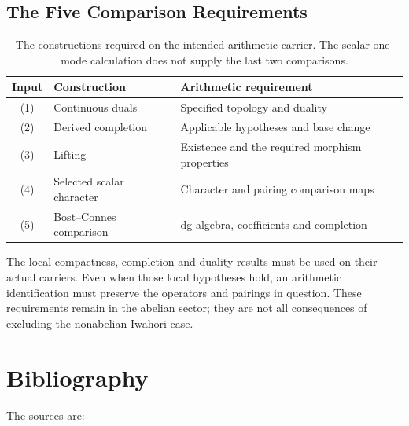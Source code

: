 \subsection{The Five Comparison Requirements}
\label{v4-arith:w5-d:combined:table}
\begin{table}[h]
\centering\small
\begin{tabular}{c|p{5.6cm}|p{4.4cm}}
Input & Construction & Arithmetic requirement\\\hline
(1) & Continuous duals & Specified topology and duality\\
(2) & Derived completion & Applicable hypotheses and base change\\
(3) & Lifting & Existence and the required morphism properties\\
(4) & Selected scalar character & Character and pairing comparison maps\\
(5) & Bost--Connes comparison & dg algebra, coefficients and completion\\
\end{tabular}
\caption{The constructions required on the intended arithmetic carrier.
The scalar one-mode calculation does not supply the last two comparisons.}
\label{v4-arith:w5-d:tab:residual-table}
\end{table}
\begin{remark}
\label{v4-arith:w5-d:combined:rem:honesty}
The local compactness, completion and duality results must be used on
their actual carriers. Even when those local hypotheses hold, an
arithmetic identification must preserve the operators and pairings in
question. These requirements remain in the abelian sector; they are
not all consequences of excluding the nonabelian Iwahori case.
\end{remark}

\section{Bibliography}
\label{v4-arith:w5-d:sec:bibliography}

The sources are:

